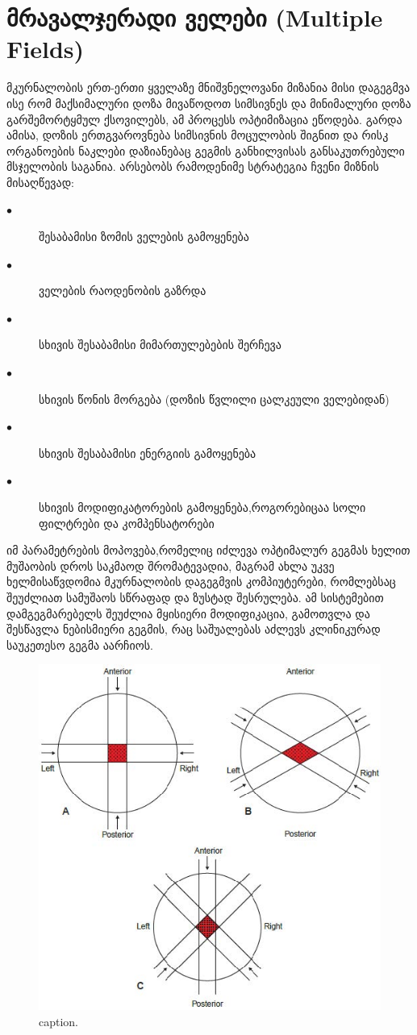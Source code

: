 \documentclass[12pt,a4paper,]{report}
\begin{document}
\section{მრავალჯერადი ველები (Multiple Fields)}
მკურნალობის ერთ-ერთი ყველაზე მნიშვნელოვანი მიზანია მისი დაგეგმვა ისე რომ მაქსიმალური დოზა მივაწოდოთ სიმსივნეს და მინიმალური დოზა გარშემორტყმულ ქსოვილებს, ამ პროცესს ოპტიმიზაცია ეწოდება. გარდა ამისა, დოზის ერთგვაროვნება სიმსივნის მოცულობის შიგნით და რისკ ორგანოების ნაკლები დაზიანებაც გეგმის განხილვისას განსაკუთრებული მსჯელობის საგანია. 
არსებობს რამოდენიმე სტრატეგია ჩვენი მიზნის მისაღწევად:
	\begin{description}
      \item[$\bullet$] შესაბამისი ზომის ველების გამოყენება
      \item[$\bullet$] ველების რაოდენობის გაზრდა
      \item[$\bullet$] სხივის შესაბამისი მიმართულებების შერჩევა
      \item[$\bullet$] სხივის წონის მორგება (დოზის წვლილი ცალკეული ველებიდან)
      \item[$\bullet$] სხივის შესაბამისი ენერგიის გამოყენება
      \item[$\bullet$] სხივის მოდიფიკატორების გამოყენება,როგორებიცაა სოლი ფილტრები და კომპენსატორები
    \end{description}
იმ პარამეტრების მოპოვება,რომელიც იძლევა ოპტიმალურ გეგმას ხელით მუშაობის დროს საკმაოდ შრომატევადია, მაგრამ ახლა უკვე ხელმისაწვდომია მკურნალობის დაგეგმვის კომპიუტერები, რომლებსაც შეუძლიათ სამუშაოს სწრაფად და ზუსტად შესრულება. ამ სისტემებით დამგეგმარებელს შეუძლია მყისიერი მოდიფიკაცია, გამოთვლა და შესწავლა ნებისმიერი გეგმის, რაც საშუალებას აძლევს კლინიკურად საუკეთესო გეგმა აარჩიოს.

	\begin{figure}[!h]
	    \centering
        \includegraphics[width = 15cm]{images/multiple_fields}
        \caption{caption.}
    \end{figure}
\end{document}
